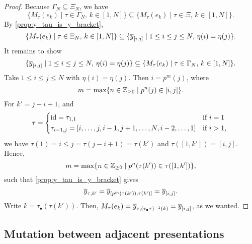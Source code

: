\begin{proof}
	Because $\Gamma_N \subseteq \Xi_N$, we have
	\begin{equation*}
		\{M_\tau(e_k) \mid \tau \in \Gamma_N,\, k \in [1, N]\}
		\subseteq \{M_\tau(e_k) \mid \tau \in \Xi,\, k \in [1, N]\}.
	\end{equation*}
	By \cref{prop:y_tau_is_y_bracket},
	\begin{equation*}
		\{M_\tau(e_k) \mid \tau \in \Xi_N,\, k \in [1, N]\} \subseteq
		\{\overline{y}_{[i,j]} \mid 1 \leq i \leq j \leq N, \, \eta(i) = \eta(j)\}.
	\end{equation*}
	It remains to show
	\begin{equation*}
		\{\overline{y}_{[i,j]} \mid 1 \leq i \leq j \leq N, \, \eta(i) = \eta(j)\} \subseteq
		\{M_\tau(e_k) \mid \tau \in \Gamma_N,\, k \in [1, N]\}.
	\end{equation*}
	Take $1 \leq i \leq j \leq N$ with $\eta(i) = \eta(j)$. Then $i = p^m(j)$, where
	\begin{equation*}
		m = \max \{n \in \mathbb{Z}_{\geq 0} \mid p^n(j) \in [i, j]\}.
	\end{equation*}
	For $k' = j - i + 1$, and
	\begin{equation*}
		\tau = \begin{dcases*}
			\id = \tau_{1,1}                                                & if $i=1$    \\
			\tau_{i-1,j} = [i, \dots, j, i-1, j+1, \dots, N, i-2, \dots, 1] & if $i > 1$,
		\end{dcases*}
	\end{equation*}
	we have $\tau(1) = i \leq j = \tau(j - i + 1) = \tau(k')$ and $\tau([1, k']) = [i, j]$.
	Hence,
	\begin{equation*}
		m = \max\{n \in \mathbb{Z}_{\geq 0} \mid p^n(\tau(k')) \in \tau([1, k'])\},
	\end{equation*}
	such that \cref{prop:y_tau_is_y_bracket} gives
	\begin{equation*}
		\overline{y}_{\tau, k'} = \overline{y}_{[p^m(\tau(k')), \tau(k')]} = \overline{y}_{[i, j]}.
	\end{equation*}
	Write $k = \tau_\bullet(\tau(k'))$. Then, $M_\tau(e_k) = \overline{y}_{\tau,
			(\tau_\bullet\tau)^{-1}(k)} = \overline{y}_{[i,j]}$, as we wanted.
\end{proof}

\subsection{Mutation between adjacent presentations}

